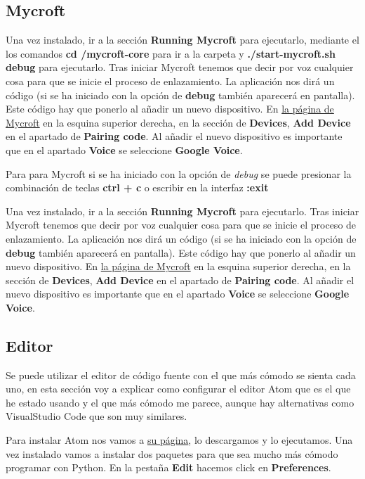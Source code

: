 \subsection{Mycroft}

Una vez instalado, ir a la sección \textbf{Running Mycroft} para ejecutarlo, mediante el los comandos \textbf{cd \detokenize{~}/mycroft-core} para ir a la carpeta y \textbf{./start-mycroft.sh debug} para ejecutarlo. Tras iniciar Mycroft tenemos que decir por voz cualquier cosa para que se inicie el proceso de enlazamiento. La aplicación nos dirá un código (si se ha iniciado con la opción de \textbf{debug} también aparecerá en pantalla). Este código hay que ponerlo al añadir un nuevo dispositivo. En \href{https://home.mycroft.ai}{la página de Mycroft} en la esquina superior derecha, en la sección de \textbf{Devices}, \textbf{Add Device} en el apartado de \textbf{Pairing code}. Al añadir el nuevo dispositivo es importante que en el apartado \textbf{Voice} se seleccione \textbf{Google Voice}.

Para para Mycroft si se ha iniciado con la opción de \textit{debug} se puede presionar la combinación de teclas \textbf{ctrl + c} o escribir en la interfaz \textbf{:exit}

Una vez instalado, ir a la sección \textbf{Running Mycroft} para ejecutarlo. Tras iniciar Mycroft tenemos que decir por voz cualquier cosa para que se inicie el proceso de enlazamiento. La aplicación nos dirá un código (si se ha iniciado con la opción de \textbf{debug} también aparecerá en pantalla). Este código hay que ponerlo al añadir un nuevo dispositivo. En \href{https://home.mycroft.ai}{la página de Mycroft} en la esquina superior derecha, en la sección de \textbf{Devices}, \textbf{Add Device} en el apartado de \textbf{Pairing code}. Al añadir el nuevo dispositivo es importante que en el apartado \textbf{Voice} se seleccione \textbf{Google Voice}.

\subsection{Editor}

Se puede utilizar el editor de código fuente con el que más cómodo se sienta cada uno, en esta sección voy a explicar como configurar el editor Atom que es el que he estado usando y el que más cómodo me parece, aunque hay alternativas como VisualStudio Code que son muy similares.

Para instalar Atom nos vamos a \href{https://atom.io/}{su página}, lo descargamos y lo ejecutamos. Una vez instalado vamos a instalar dos paquetes para que sea mucho más cómodo programar con Python. En la pestaña \textbf{Edit} hacemos click en \textbf{Preferences}.

